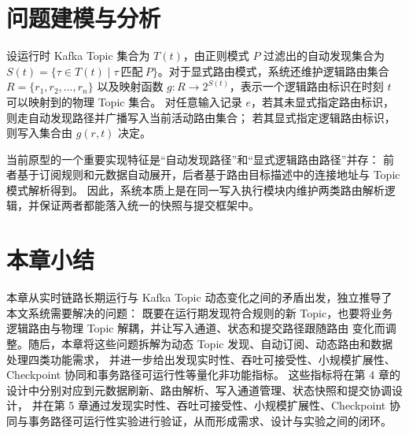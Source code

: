 \section{问题建模与分析}

设运行时 Kafka Topic 集合为 $T(t)$，由正则模式 $P$ 过滤出的自动发现集合为
$S(t)=\{\tau\in T(t)\mid \tau\ \text{匹配}\ P\}$。对于显式路由模式，系统还维护逻辑路由集合
$R=\{r_1,r_2,\dots,r_n\}$ 以及映射函数
$g:R\rightarrow 2^{S(t)}$，表示一个逻辑路由标识在时刻 $t$ 可以映射到的物理 Topic 集合。
对任意输入记录 $e$，若其未显式指定路由标识，则走自动发现路径并广播写入当前活动路由集合；
若其显式指定逻辑路由标识，则写入集合由 $g(r,t)$ 决定。

当前原型的一个重要实现特征是“自动发现路径”和“显式逻辑路由路径”并存：
前者基于订阅规则和元数据自动展开，后者基于路由目标描述中的连接地址与 Topic 模式解析得到。
因此，系统本质上是在同一写入执行模块内维护两类路由解析逻辑，并保证两者都能落入统一的快照与提交框架中。

\clearpage
\section{本章小结}

本章从实时链路长期运行与 Kafka Topic 动态变化之间的矛盾出发，独立推导了本文系统需要解决的问题：
既要在运行期发现符合规则的新 Topic，也要将业务逻辑路由与物理 Topic 解耦，并让写入通道、状态和提交路径跟随路由
变化而调整。随后，本章将这些问题拆解为动态 Topic 发现、自动订阅、动态路由和数据处理四类功能需求，
并进一步给出发现实时性、吞吐可接受性、小规模扩展性、Checkpoint 协同和事务路径可运行性等量化非功能指标。
这些指标将在第 4 章的设计中分别对应到元数据刷新、路由解析、写入通道管理、状态快照和提交协调设计，
并在第 5 章通过发现实时性、吞吐可接受性、小规模扩展性、Checkpoint 协同与事务路径可运行性实验进行验证，从而形成需求、设计与实验之间的闭环。
